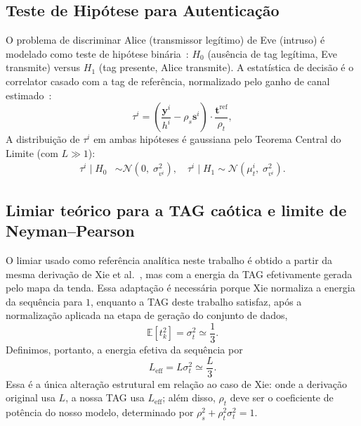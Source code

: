 \documentclass[12pt,a4paper]{article}
\begin{document}
\subsection{Teste de Hipótese para Autenticação}\label{sec:hip}

O problema de discriminar Alice (transmissor legítimo) de Eve (intruso) é modelado como teste de hipótese binária~\cite{ref_poor}: $H_0$ (ausência de tag legítima, Eve transmite) versus $H_1$ (tag presente, Alice transmite). A estatística de decisão é o correlator casado com a tag de referência, normalizado pelo ganho de canal estimado~\cite{ref_xie}:
\begin{equation}\label{eq:tau}
    \tau^i = \left(\frac{\mathbf{y}^i}{h^i} - \rho_s \mathbf{s}^i\right) \cdot \frac{\mathbf{t}^{\mathrm{ref}}}{\rho_t},
\end{equation}
A distribuição de $\tau^i$ em ambas hipóteses é gaussiana pelo Teorema Central do Limite (com $L \gg 1$):
\begin{align}
    \tau^i \mid H_0 &\sim \mathcal{N}\!\left(0,\; \sigma_{v^i}^2\right),\quad
    \tau^i \mid H_1 \sim \mathcal{N}\!\left(\mu_{t}^i,\; \sigma_{v^i}^2\right). \label{eq:dists}
\end{align}

\subsection{Limiar teórico para a TAG caótica e limite de Neyman--Pearson}\label{sec:np_limit}

O limiar usado como referência analítica neste trabalho é obtido a partir da mesma derivação de Xie et al.~\cite{ref_xie}, mas com a energia da TAG efetivamente gerada pelo mapa da tenda. Essa adaptação é necessária porque Xie normaliza a energia da sequência para $1$, enquanto a TAG deste trabalho satisfaz, após a normalização aplicada na etapa de geração do conjunto de dados,
\begin{equation}
    \mathbb{E}[t_k^2]=\sigma_t^2\simeq\frac{1}{3}.
    \label{eq:tag_energy}
\end{equation}
Definimos, portanto, a energia efetiva da sequência por
\begin{equation}
    L_{\mathrm{eff}}=L\sigma_t^2\simeq\frac{L}{3}.
    \label{eq:leff}
\end{equation}
Essa é a única alteração estrutural em relação ao caso de Xie: onde a derivação original usa $L$, a nossa TAG usa $L_{\mathrm{eff}}$; além disso, $\rho_t$ deve ser o coeficiente de potência do nosso modelo, determinado por $\rho_s^2+\rho_t^2\sigma_t^2=1$.
\end{document}
